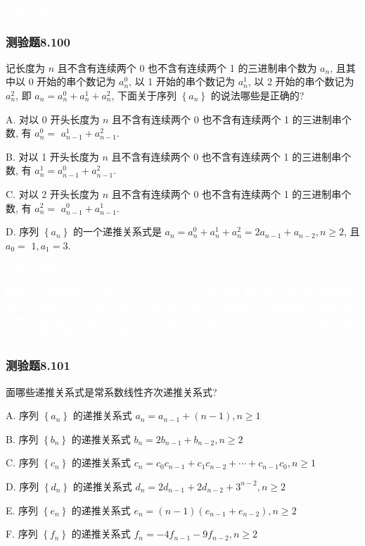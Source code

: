 \documentclass[UTF8, heading=true]{ctexart}
\begin{document}
\textcolor{white}{答案：AD}

\subsubsection{测验题8.100}

记长度为 $n$ 且不含有连续两个 0 也不含有连续两个 1 的三进制串个数为 $a_n$, 且其中以 0 开始的串个数记为 $a_n^0$, 以 1 开始的串个数记为 $a_n^1$, 以 2 开始的串个数记为 $a_n^2$, 即 $a_n=a_n^0+a_n^1+a_n^2$, 下面关于序列 $\left\{a_n\right\}$ 的说法哪些是正确的?

A. 
对以 0 开头长度为 $n$ 且不含有连续两个 0 也不含有连续两个 1 的三进制串个数, 有 $a_n^0=$ $a_{n-1}^1+a_{n-1}^2$.

B. 对以 1 开头长度为 $n$ 且不含有连续两个 0 也不含有连续两个 1 的三进制串个数, 有 $a_n^1=a_{n-1}^0+a_{n-1}^2$.

C. 对以 2 开头长度为 $n$ 且不含有连续两个 0 也不含有连续两个 1 的三进制串个数, 有 $a_n^2=$ $a_{n-1}^0+a_{n-1}^1$.

D. 序列 $\left\{a_n\right\}$ 的一个递推关系式是 $a_n=a_n^0+a_n^1+a_n^2=2 a_{n-1}+a_{n-2}, n \geq 2$, 且 $a_0=$ $1, a_1=3$.

\textcolor{white}{答案：ABD}

\textcolor{white}{解析：C选项应为$a_n^2=a_{n-1}^0+a_{n-1}^1+a_{n-2}$,长度为n的字符串以2开头分为三种情况：1. 以0开头,长度为n-1,2. 以1开头,长度为n-1,3. 以2开头,长度为n-2。
前两者的个数分别为$a_{n-1}^0$和$a_{n-1}^1$,第三种情况相当于长度为n的字符串开头为两个2,只需后面的n-2个字符满足条件即可,个数为$a_{n-2}$。
}

\subsubsection{测验题8.101}

面哪些递推关系式是常系数线性齐次递推关系式?

A. 序列 $\left\{a_n\right\}$ 的递推关系式 $a_n=a_{n-1}+(n-1),  n \geq 1$

B. 序列 $\left\{b_n\right\}$ 的递推关系式 $b_n=2 b_{n-1}+b_{n-2},  n \geq 2$

C. 序列 $\left\{c_n\right\}$ 的递推关系式 $c_n=c_0 c_{n-1}+c_1 c_{n-2}+\cdots+c_{n-1} c_0,  n \geq 1$

D. 序列 $\left\{d_n\right\}$ 的递推关系式 $d_n=2 d_{n-1}+2 d_{n-2}+3^{n-2},  n \geq 2$

E. 序列 $\left\{e_n\right\}$ 的递推关系式 $e_n=(n-1)\left(e_{n-1}+e_{n-2}\right),  n \geq 2$

F. 序列 $\left\{f_n\right\}$ 的递推关系式 $f_n=-4 f_{n-1}-9 f_{n-2},  n \geq 2$
\end{document}
